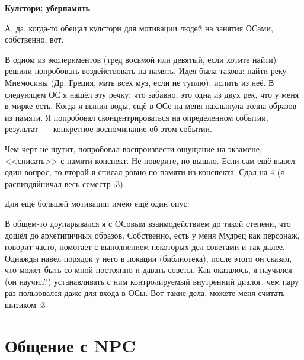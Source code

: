 \documentclass[a5paper,12pt,twoside]{memoir}
\begin{document}
\begin{shaded}

\begin{center}
\Large\textbf{Кулстори: уберпамять}
\end{center}

А, да, когда-то обещал кулстори для мотивации людей на занятия ОСами, собственно, вот.

В одном из экспериментов (тред восьмой или девятый, если хотите найти) решили попробовать воздействовать на память. Идея была такова: найти реку Мнемосины (Др. Греция, мать всех муз, если не туплю), испить из неё. В следующем ОС я нашёл эту речку; что забавно, это одна из двух рек, что у меня в мирке есть. Когда я выпил воды, ещё в ОСе на меня нахлынула волна образов из памяти. Я попробовал сконцентрироваться на определенном событии, результат~--- конкретное воспоминание об этом событии.

Чем черт не шутит, попробовал воспроизвести ощущение на экзамене, <<списать>> с памяти конспект. Не поверите, но вышло. Если сам ещё вывел один вопрос, то второй я списал ровно по памяти из конспекта. Сдал на 4 (я распиздяйничал весь семестр :3).

Для ещё большей мотивации имею ещё один опус:

В общем-то доупарывался я с ОСовым взаимодействием до такой степени, что дошёл до архетипичных образов. Собственно, есть у меня Мудрец как персонаж, говорит часто, помогает с выполнением некоторых дел советами и так далее. Однажды навёл порядок у него в локации (библиотека), после этого он сказал, что может быть со мной постоянно и давать советы. Как оказалось, я научился (он научил?) устанавливать с ним контролируемый внутренний диалог, чем пару раз пользовался даже для входа в ОСы. Вот такие дела, можете меня считать шизиком :3

\end{shaded}

\clearpage



\section{Общение с NPC}

\end{document}

